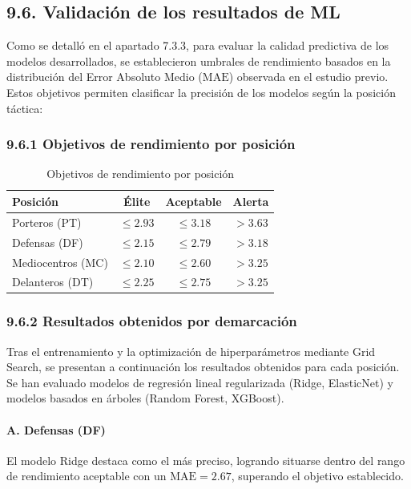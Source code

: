 \subsection{9.6. Validación de los resultados de ML}

Como se detalló en el apartado 7.3.3, para evaluar la calidad 
predictiva de los modelos desarrollados, se establecieron umbrales 
de rendimiento basados en la distribución del Error Absoluto Medio 
($\mathrm{MAE}$) observada en el estudio previo. Estos objetivos 
permiten clasificar la precisión de los modelos según la posición 
táctica:


\subsubsection{9.6.1 Objetivos de rendimiento por posición}

\begin{table}[H]
\centering
\small
\begin{tabular}{|l|c|c|c|}
\hline
\textbf{Posición} & \textbf{Élite} & \textbf{Aceptable} & 
\textbf{Alerta} \\
\hline
Porteros (PT) & $\le 2.93$ & $\le 3.18$ & 
$> 3.63$ \\
Defensas (DF) & $\le 2.15$ & $\le 2.79$ & 
$> 3.18$ \\
Mediocentros (MC) & $\le 2.10$ & $\le 2.60$ & 
$> 3.25$ \\
Delanteros (DT) & $\le 2.25$ & $\le 2.75$ & 
$> 3.25$ \\
\hline
\end{tabular}
\caption{Objetivos de rendimiento por posición}
\end{table}


\subsubsection{9.6.2 Resultados obtenidos por demarcación}

Tras el entrenamiento y la optimización de hiperparámetros mediante 
Grid Search, se presentan a continuación los resultados obtenidos 
para cada posición. Se han evaluado modelos de regresión lineal 
regularizada (Ridge, ElasticNet) y modelos basados en árboles 
(Random Forest, XGBoost).


\paragraph{A. Defensas (DF)}

El modelo Ridge destaca como el más preciso, logrando situarse 
dentro del rango de rendimiento aceptable con un 
$\mathrm{MAE} = 2.67$, superando el objetivo establecido.

